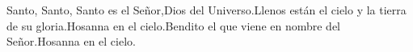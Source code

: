 \be Santo, Santo, Santo es el Señor,\redast Dios del Universo.\redast Llenos están el cielo y la tierra de su gloria.\redast Hosanna en el cielo.\redast Bendito el que viene en nombre del Señor.\redast Hosanna en el cielo.